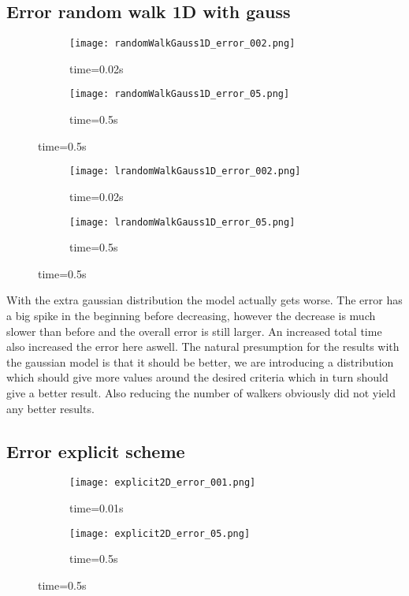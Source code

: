 \documentclass[a4paper,11pt]{article}
\begin{document}
\subsection{Error random walk 1D with gauss}
    \begin{figure}[H]
        \caption{Error random walk gauss $10^6$ walkers $\Delta t=0.00005$}
        \captionsetup[subfigure]{labelformat=empty}
        \begin{subfigure}[b!]{0.55\textwidth}
            \texttt{[image: randomWalkGauss1D\_error\_002.png]}
            \caption{time=0.02s}
        \end{subfigure}
        \begin{subfigure}[b!]{0.55\textwidth}
            \texttt{[image: randomWalkGauss1D\_error\_05.png]}
            \caption{time=0.5s}
        \end{subfigure}
    \end{figure}
    \begin{figure}[H]
        \caption{Error random walk gauss $10^4$ walkers $\Delta t=0.0005$}
        \captionsetup[subfigure]{labelformat=empty}
        \begin{subfigure}[b!]{0.55\textwidth}
            \texttt{[image: lrandomWalkGauss1D\_error\_002.png]}
            \caption{time=0.02s}
        \end{subfigure}
        \begin{subfigure}[b!]{0.55\textwidth}
            \texttt{[image: lrandomWalkGauss1D\_error\_05.png]}
            \caption{time=0.5s}
        \end{subfigure}
    \end{figure} \justify

    With the extra gaussian distribution the model actually gets worse. The error has a big spike in the beginning before decreasing, however the decrease is much slower than before and the overall error is still larger. An increased total time also increased the error here aswell. The natural presumption for the results with the gaussian model is that it should be better, we are introducing a distribution which should give more values around the desired criteria which in turn should give a better result. Also reducing the number of walkers obviously did not yield any better results.
\subsection{Error explicit scheme}
    \begin{figure}[H]
        \caption{Error explicit scheme $\Delta t=0.00005$}
        \captionsetup[subfigure]{labelformat=empty}
        \begin{subfigure}[b!]{0.55\textwidth}
            \texttt{[image: explicit2D\_error\_001.png]}
            \caption{time=0.01s}
        \end{subfigure}
        \begin{subfigure}[b!]{0.55\textwidth}
            \texttt{[image: explicit2D\_error\_05.png]}
            \caption{time=0.5s}
        \end{subfigure}
    \end{figure}
    
\end{document}
